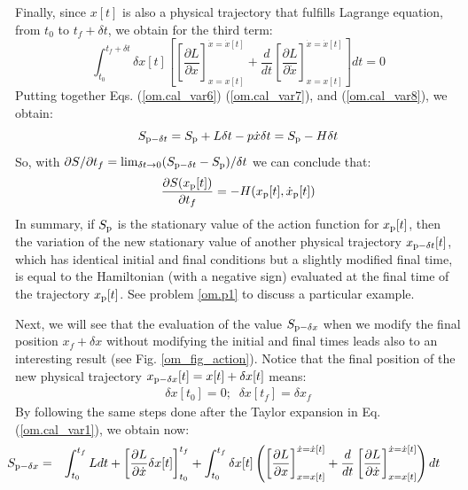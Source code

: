 \documentclass[nofootinbib, secnumarabic, amsmath, nobibnotes,11pt,aps,pra, floatfix]{revtex4-1}
\newcommand{\fref}[1]{Fig. \ref{#1}}
\newcommand{\eref}[1]{Eq. (\ref{#1})}
\begin{document}
Finally, since $x[t]$ is also a physical trajectory that fulfills
Lagrange equation, 
 from  $t_0$ to $t_f +
\delta t$, we obtain for the third term:
\begin{equation}
\label{om.cal_var8}
\int_{t_0}^{t_f + \delta t} \delta x[t] \left[ \left[ \frac {\partial L} {\partial x} \right]_{x = x[t]}^{\dot{x} = \dot{x}[t]} + \frac {d} {dt} \left[ \frac {\partial L} {\partial \dot{x}} \right]_{x = x[t]}^{\dot{x} = \dot{x}[t]} \right]dt = 0
\end{equation}
Putting together Eqs. (\ref{om.cal_var6}) (\ref{om.cal_var7}), and (\ref{om.cal_var8}), we obtain:
\begin{equation}
\label{om.cal_var9}
 S_{{\rm p} - \delta t} = S_{\rm p} + L \delta t - p \dot{x} \delta t = S_{\rm p} - H \delta t
\end{equation}
So, with ${\partial S}/{\partial t_f} = \lim_{\delta t \rightarrow 0}(S_{{\rm p} - \delta t} - S_{\rm p})/\delta t$ we can conclude that:
\begin{equation}
\label{om.HJ1}
\frac{\partial S(x_{\rm p}[t])} {\partial t_f} = -H(x_{\rm p}[t],\dot{x}_{\rm p}[t])
\end{equation}
In summary, if $S_{\rm p}$ is the stationary value of the action function for $x_{\rm p}[t]$, then the variation of the new stationary value of another physical trajectory $x_{{\rm p} - \delta t}[t]$, which has identical initial and final conditions but a slightly modified final time, is equal to the Hamiltonian (with a negative sign) evaluated at the final time of the trajectory $x_{\rm p}[t]$. See problem \ref{om.p1} to discuss a particular example.

Next, we will see that the evaluation of the value $S_{{\rm p} - \delta x}$ when we modify the final position $x_f + \delta x$ without modifying the initial and final times leads also to an interesting result (see \fref{om_fig_action}). Notice that the final position of the new physical trajectory $x_{{\rm p} - \delta x}[t] = x[t] + \delta x[t]$ means:
\begin{eqnarray}
\label{om.cal_var10}
\delta x[t_0] = 0  ; \; \; \delta x[t_f] = \delta x_f
\end{eqnarray}
By following the same steps done after the Taylor expansion in \eref{om.cal_var1}, we obtain now:
\begin{eqnarray}
\label{om.cal_var11}
\hspace*{-24pt}S_{{\rm p} - \delta x} &=& \int_{t_0}^{t_f} L dt + \left[ \frac
 {\partial L} {\partial \dot{x}} \delta x[t] \right]_{t_0}^{t_f} + \int_{t_0}^{t_f} \delta x[t] \left(\left[ \frac {\partial L} {\partial x} \right]_{x = x[t]}^{\dot{x} = \dot{x}[t]} + \frac {d} {dt} \left[ \frac {\partial L} {\partial \dot{x}} \right]_{x = x[t]}^{\dot{x} = \dot{x}[t]} \right) dt
\end{eqnarray}\vspace*{-12pt}
\end{document}
